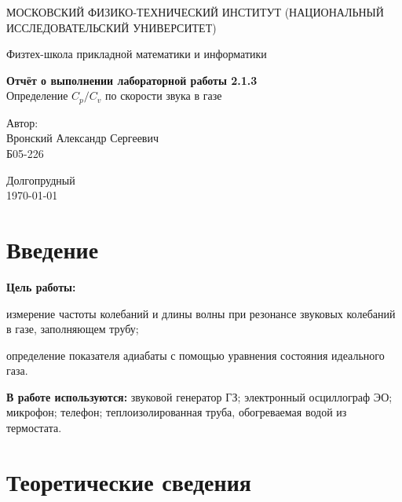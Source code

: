 \documentclass[a4paper,12pt]{article}
\date{\today}
\begin{document}
\begin{titlepage}
	\begin{center}
		{\large МОСКОВСКИЙ ФИЗИКО-ТЕХНИЧЕСКИЙ ИНСТИТУТ (НАЦИОНАЛЬНЫЙ ИССЛЕДОВАТЕЛЬСКИЙ УНИВЕРСИТЕТ)}
	\end{center}
	\begin{center}
		{\large Физтех-школа прикладной математики и информатики}
	\end{center}


	\vspace{4.5cm}
	{\huge
		\begin{center}
			{\bf Отчёт о выполнении лабораторной работы 2.1.3}\\
      Определение $ C_p/C_v $ по скорости звука в газе
		\end{center}
	}
	\vspace{2cm}
	\begin{flushright}
		{\LARGE Автор:\\ Вронский Александр Сергеевич \\
			\vspace{0.2cm}
			Б05-226}
	\end{flushright}
	\vspace{8cm}
	\begin{center}
		Долгопрудный\\
		\today
	\end{center}
\end{titlepage}

\section{Введение}

\textbf{Цель работы:}
\begin{enumerate*}[label=\arabic*)]
  \item измерение частоты колебаний и длины волны при резонансе звуковых колебаний в газе, заполняющем трубу;
  \item определение показателя адиабаты с помощью уравнения состояния идеального газа.
\end{enumerate*}

\textbf{В работе используются:} звуковой генератор ГЗ; электронный осциллограф ЭО; микрофон; телефон; теплоизолированная труба, обогреваемая водой из термостата.

\section{Теоретические сведения}
\end{document}
